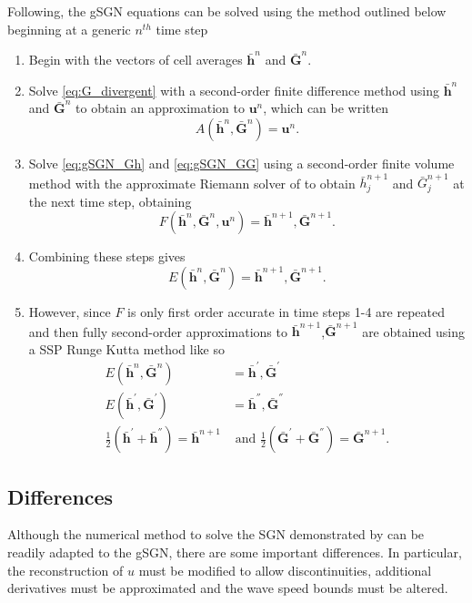 \documentclass[10pt]{elsarticle}
\newcommand{\vecn}[1]{\boldsymbol{#1}}
\begin{document}
Following, \citet{Zoppou-etal-2017} the gSGN equations can be solved using the method outlined below beginning at a generic $n^{th}$ time step
\begin{enumerate}
	\item Begin with the vectors of cell averages $\bar{\vecn{h}}^n$ and $\bar{\vecn{G}}^n$.
	\item Solve \eqref{eq:G_divergent} with a second-order finite difference method using $\bar{\vecn{h}}^n$ and $\bar{\vecn{G}}^n$ to obtain an approximation to ${\vecn{u}}^n$, which can be written
	\[{A}\left(\bar{\vecn{h}}^n,\bar{\vecn{G}}^n\right) = {\vecn{u}}^n.\]
	\item Solve \eqref{eq:gSGN_Gh} and \eqref{eq:gSGN_GG} using a second-order finite volume method with the approximate Riemann solver of \citet{Kurganov-etal-2001-707} to obtain $\bar{h}^{n+1}_j$ and $\bar{G}^{n+1}_j$ at the next time step, obtaining
	\[{F}\left(\bar{\vecn{h}}^n,\bar{\vecn{G}}^n,{\vecn{u}}^n\right) = \bar{\vecn{h}}^{n+1 },\bar{\vecn{G}}^{n+1}.\]
	\item Combining these steps gives
	\[{E}(\bar{\vecn{h}}^{n},\bar{\vecn{G}}^{n}) = \bar{\vecn{h}}^{n+1 },\bar{\vecn{G}}^{n+1}.\]
	\item However, since ${F}$ is only first order accurate in time steps 1-4 are repeated and then fully second-order approximations to $\bar{\vecn{h}}^{n+1 }$,$\bar{\vecn{G}}^{n+1}$ are obtained using a SSP Runge Kutta method \cite{Gottlieb-etal-2003-89} like so
	\begin{align*}
	{E}(\bar{\vecn{h}}^{n},\bar{\vecn{G}}^{n}) &= \bar{\vecn{h}}^{'},\bar{\vecn{G}}^{'}\\
	{E}(\bar{\vecn{h}}^{'},\bar{\vecn{G}}^{'}) &= \bar{\vecn{h}}^{''},\bar{\vecn{G}}^{''}\\
	\frac{1}{2}\left(\bar{\vecn{h}}^{'} + \bar{\vecn{h}}^{''} \right) = \bar{\vecn{h}}^{n+1 } &\text{  and  }
		\frac{1}{2}\left(\bar{\vecn{G}}^{'} + \bar{\vecn{G}}^{''} \right) = \bar{\vecn{G}}^{n+1 }. 
	\end{align*}
\end{enumerate}

\subsection{Differences}
Although the numerical method to solve the SGN demonstrated by \citet{Zoppou-etal-2017} can be readily adapted to the gSGN, there are some important differences. In particular, the reconstruction of $u$ must be modified to allow discontinuities, additional derivatives must be approximated and the wave speed bounds must be altered. 
\end{document}
